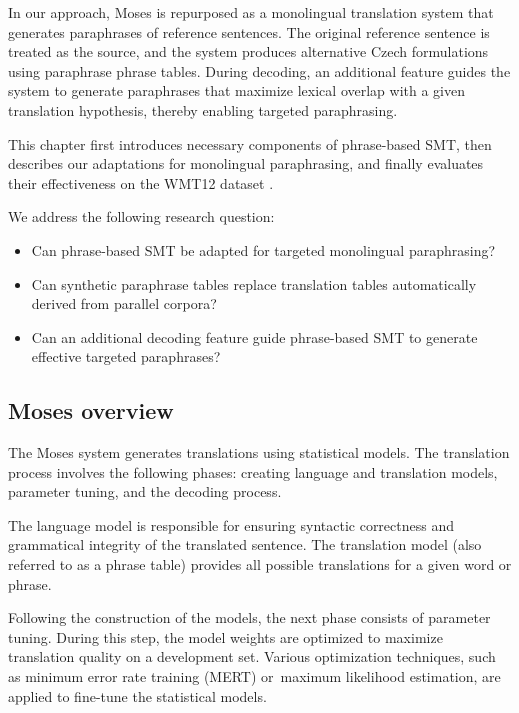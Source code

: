 In our approach, Moses is repurposed as a monolingual translation system that generates paraphrases of reference sentences. The original reference sentence is treated as the source, and the system produces alternative Czech formulations using paraphrase phrase tables. During decoding, an additional feature guides the system to generate paraphrases that maximize lexical overlap with a given translation hypothesis, thereby enabling targeted paraphrasing.

This chapter first introduces necessary components of phrase-based SMT, then describes our adaptations for monolingual paraphrasing, and finally evaluates their effectiveness on the WMT12 dataset \citep{wmt12}. 

\pagebreak
\begin{mdframed}[
    linecolor=gray,
    linewidth=2pt,
    roundcorner=5,
    backgroundcolor=gray!5
]
\noindent We address the following research question:
\begin{itemize}
    \item Can phrase-based SMT be adapted for targeted monolingual paraphrasing?
    \item Can synthetic paraphrase tables replace translation tables automatically derived from parallel corpora?
    \item Can an additional decoding feature guide phrase-based SMT to generate effective targeted paraphrases?
\end{itemize}

\end{mdframed}

\subsection{Moses overview}
The Moses system generates translations using statistical models. The translation process involves the following phases: creating language and translation models, parameter tuning, and the decoding process. 

The language model is responsible for ensuring syntactic correctness and grammatical integrity of the translated sentence. The translation model (also referred to as a phrase table) provides all possible translations for a given word or phrase. 

Following the construction of the models, the next phase consists of parameter tuning. During this step, the model weights are optimized to maximize translation quality on a development set. Various optimization techniques, such as minimum error rate training (MERT) or~maximum likelihood estimation, are applied to fine-tune the statistical models.

